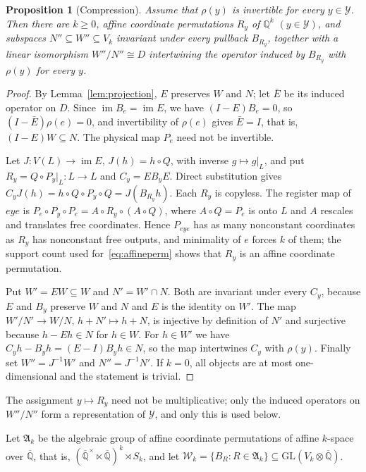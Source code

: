 \documentclass[acmlarge,screen,11pt,nonacm,natbib=false]{acmart}
\newcommand{\Q}{\mathbb{Q}}
\newcommand{\Qb}{\overline{\mathbb{Q}}}
\newcommand{\cW}{\mathcal{W}}
\newcommand{\cY}{\mathcal{Y}}
\newcommand{\im}{\operatorname{im}}
\newcommand{\GL}{\mathrm{GL}}
\newtheorem{proposition}[theorem]{Proposition}
\theoremstyle{definition}
\begin{document}
\begin{proposition}[Compression]\label{prop:compression}
Assume that $\rho(y)$ is invertible for every $y\in\cY$. Then there are $k\ge0$, affine coordinate permutations $R_y$ of $\Q^k$ $(y\in\cY)$, and subspaces $N''\subseteq W''\subseteq V_k$ invariant under every pullback $B_{R_y}$, together with a linear isomorphism $W''/N''\cong D$ intertwining the operator induced by $B_{R_y}$ with $\rho(y)$ for every $y$.
\end{proposition}
\begin{proof}
By Lemma~\ref{lem:projection}, $E$ preserves $W$ and $N$; let $\bar E$ be its induced operator on $D$. Since $\im B_e=\im E$, we have $(I-E)B_e=0$, so $(I-\bar E)\rho(e)=0$, and invertibility of $\rho(e)$ gives $\bar E=I$, that is, $(I-E)W\subseteq N$. The physical map $P_e$ need not be invertible.

Let $J:V(L)\to\im E$, $J(h)=h\circ Q$, with inverse $g\mapsto g|_L$, and put $R_y=Q\circ P_y|_L:L\to L$ and $C_y=EB_yE$. Direct substitution gives $C_yJ(h)=h\circ Q\circ P_y\circ Q=J(B_{R_y}h)$. Each $R_y$ is copyless. The register map of $eye$ is $P_e\circ P_y\circ P_e=A\circ R_y\circ(A\circ Q)$, where $A\circ Q=P_e$ is onto $L$ and $A$ rescales and translates free coordinates. Hence $P_{eye}$ has as many nonconstant coordinates as $R_y$ has nonconstant free outputs, and minimality of $e$ forces $k$ of them; the support count used for~\eqref{eq:affineperm} shows that $R_y$ is an affine coordinate permutation.

Put $W'=EW\subseteq W$ and $N'=W'\cap N$. Both are invariant under every $C_y$, because $E$ and $B_y$ preserve $W$ and $N$ and $E$ is the identity on $W'$. The map $W'/N'\to W/N$, $h+N'\mapsto h+N$, is injective by definition of $N'$ and surjective because $h-Eh\in N$ for $h\in W$. For $h\in W'$ we have $C_yh-B_yh=(E-I)B_yh\in N$, so the map intertwines $C_y$ with $\rho(y)$. Finally set $W''=J^{-1}W'$ and $N''=J^{-1}N'$. If $k=0$, all objects are at most one-dimensional and the statement is trivial.
\end{proof}
The assignment $y\mapsto R_y$ need not be multiplicative; only the induced operators on $W''/N''$ form a representation of $\cY$, and only this is used below.

Let $\mathfrak A_k$ be the algebraic group of affine coordinate permutations of affine $k$-space over $\Qb$, that is, $(\Qb^\times\ltimes\Qb)^k\rtimes S_k$, and let $\cW_k=\{B_R:R\in\mathfrak A_k\}\subseteq\GL(V_k\otimes\Qb)$.
\end{document}
